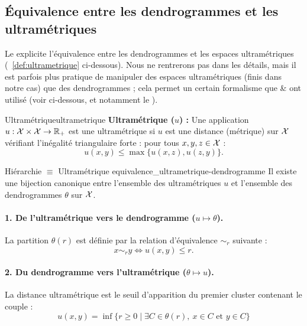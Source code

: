 \subsection{Équivalence entre les dendrogrammes et les ultramétriques}

Le  explicite l'équivalence entre les dendrogrammes et les espaces ultramétriques (\Def~\ref{def:ultrametrique} ci-dessous).
Nous ne rentrerons pas dans les détails, mais il est parfois plus pratique de manipuler des espaces ultramétriques (finis dans notre cas) que des dendrogrammes ; cela permet un certain formalisme que  \&  ont utilisé (voir ci-dessous, et notamment le ).

\begin{Definition}{Ultramétrique}{ultrametrique}
    \textbf{Ultramétrique ($u$) :} Une application $u : \mathcal{X} \times \mathcal{X} \to \mathbb{R}_+$ est une ultramétrique si $u$ est une distance (métrique) sur $\mathcal{X}$ vérifiant l'inégalité triangulaire forte : pour tous $x, y, z \in \mathcal{X}$ :
    \[
    \boxed{
        u(x, y) \leq \max \bigl\{ u(x, z), u(z, y) \bigr\}.
        }
    \]
\end{Definition}



\begin{Resultat}{Hiérarchie $\equiv$ Ultramétrique \cite{Johnson1967}}{equivalence_ultrametrique-dendrogramme}
Il existe une bijection canonique entre l'ensemble des ultramétriques $u$ et l'ensemble des dendrogrammes $\theta$ sur $\mathcal{X}$.

\paragraph{1. De l'ultramétrique vers le dendrogramme ($u \mapsto \theta$).}
La partition $\theta(r)$ est définie par la relation d'équivalence $\sim_r$ suivante :
\[
\boxed{
    x \sim_r y \iff u(x, y) \leq r .
    }
\]

\paragraph{2. Du dendrogramme vers l'ultramétrique ($\theta \mapsto u$).}
La distance ultramétrique est le seuil d'apparition du premier cluster contenant le couple :
\begin{equation}\label{eq:ancetre_commun}
\boxed{
    u(x, y) = \inf \{ r \geq 0 \mid \exists C \in \theta(r), \ x \in C \text{ et } y \in C \}
    }
\end{equation}
\end{Resultat}




